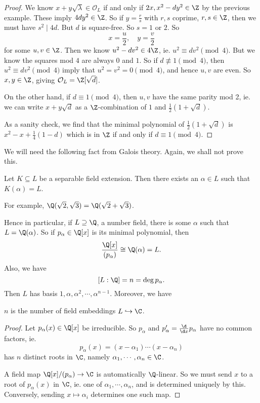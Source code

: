 \documentclass[a4paper]{article}
\begin{document}
\begin{proof}
  We know $x + y \sqrt{\lambda} \in \mathcal{O}_L$ if and only if $2x, x^2 - dy^2 \in \Z$ by the previous example. These imply $4dy^2 \in \Z$. So if $y = \frac{r}{s}$ with $r, s$ coprime, $r, s \in \Z$, then we must have $s^2 \mid 4d$. But $d$ is square-free. So $s = 1$ or $2$. So
  \[
    x = \frac{u}{2},\quad y = \frac{v}{2}
  \]
  for some $u, v \in \Z$. Then we know $u^2 - dv^2 \in 4\Z$, ie. $u^2 \equiv dv^2 \pmod 4$. But we know the squares mod $4$ are always $0$ and $1$. So if $d \not\equiv 1 \pmod 4$, then $u^2 \equiv dv^2\pmod 4$ imply that $u^2 = v^2 = 0\pmod 4$, and hence $u, v$ are even. So $x, y \in \Z$, giving $\mathcal{O}_L = \Z[\sqrt{d}]$.

  On the other hand, if $d \equiv 1\pmod 4$, then $u, v$ have the same parity mod 2, ie. we can write $x + y\sqrt{d}$ as a $\Z$-combination of $1$ and $\frac{1}{2}(1 + \sqrt{d})$.

  As a sanity check, we find that the minimal polynomial of $\frac{1}{2}(1 + \sqrt{d})$ is $x^2 - x + \frac{1}{4}(1 - d)$ which is in $\Z$ if and only if $d \equiv 1 \pmod 4$.
\end{proof}

We will need the following fact from Galois theory. Again, we shall not prove this.
\begin{thm}
  Let $K \subseteq L$ be a separable field extension. Then there exists an $\alpha \in L$ such that $K(\alpha) = L$.
\end{thm}

For example, $\Q(\sqrt{2}, \sqrt{3}) = \Q(\sqrt{2} + \sqrt{3})$.

Hence in particular, if $L \supseteq \Q$, a number field, there is some $\alpha$ such that $L = \Q(\alpha)$. So if $p_\alpha \in \Q[x]$ is its minimal polynomial, then
\[
  \frac{\Q[x]}{(p_\alpha)} \cong \Q(\alpha) = L.
\]
Also, we have
\[
  [L:\Q] = n = \deg p_\alpha.
\]
Then $L$ has basis $1, \alpha, \alpha^2, \cdots, \alpha^{n - 1}$. Moreover, we have
\begin{lemma}
  $n$ is the number of field embeddings $L \hookrightarrow \C$.
\end{lemma}

\begin{proof}
  Let $p_\alpha(x) \in \Q[x]$ be irreducible. So $p_\alpha$ and $p_\alpha' = \frac{\d}{\d x}p_\alpha$ have no common factors, ie.
  \[
    p_\alpha(x) = (x - \alpha_1) \cdots (x - \alpha_n)
  \]
  has $n$ distinct roots in $\C$, namely $\alpha_1, \cdots, \alpha_n \in \C$.

  A field map $\Q[x]/(p_\alpha) \to \C$ is automatically $\Q$-linear. So we must send $x$ to a root of $p_\alpha(x)$ in $\C$, ie. one of $\alpha_1, \cdots, \alpha_n$, and is determined uniquely by this. Conversely, sending $x \mapsto \alpha_i$ determines one such map.
\end{proof}
\end{document}
